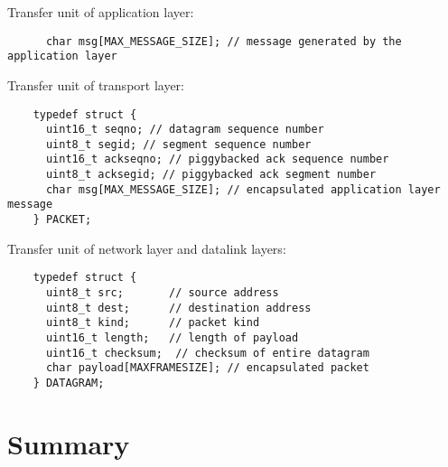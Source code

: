 \documentclass[11pt,a4paper,oneside]{report}
\begin{document}
Transfer unit of application layer:
    \begin{lstlisting}
      char msg[MAX_MESSAGE_SIZE]; // message generated by the application layer
    \end{lstlisting}

Transfer unit of transport layer:

    \begin{lstlisting}
    typedef struct {
      uint16_t seqno; // datagram sequence number
      uint8_t segid; // segment sequence number
      uint16_t ackseqno; // piggybacked ack sequence number
      uint8_t acksegid; // piggybacked ack segment number
      char msg[MAX_MESSAGE_SIZE]; // encapsulated application layer message
    } PACKET;
    \end{lstlisting}

Transfer unit of network layer and datalink layers:

    \begin{lstlisting}
    typedef struct {
      uint8_t src;       // source address
      uint8_t dest;      // destination address
      uint8_t kind;      // packet kind
      uint16_t length;   // length of payload
      uint16_t checksum;  // checksum of entire datagram
      char payload[MAXFRAMESIZE]; // encapsulated packet
    } DATAGRAM;
   \end{lstlisting}


\section*{Summary}
\end{document}
